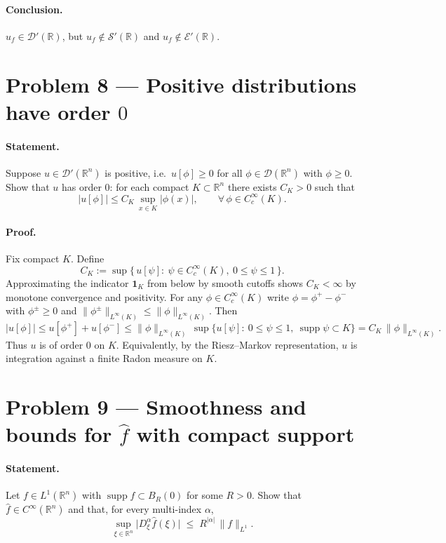 \documentclass[12pt,a4paper]{article}
\theoremstyle{plain}
\theoremstyle{definition}
\theoremstyle{remark}
\theoremstyle{remark}
\begin{document}
\paragraph{Conclusion.}
$u_f\in\mathcal D'(\mathbb R)$, but $u_f\notin\mathcal S'(\mathbb R)$ and $u_f\notin\mathcal E'(\mathbb R)$.

\bigskip
\bigskip

\section*{Problem 8 — Positive distributions have order $0$}

\paragraph{Statement.}
Suppose $u\in\mathcal D'(\mathbb R^n)$ is positive, i.e.\ $u[\phi]\ge 0$ for all $\phi\in\mathcal D(\mathbb R^n)$ with $\phi\ge 0$.
Show that $u$ has order $0$: for each compact $K\subset\mathbb R^n$ there exists $C_K>0$ such that
\[
|u[\phi]|\le C_K\,\sup_{x\in K}|\phi(x)|,\qquad \forall\,\phi\in C_c^\infty(K).
\]

\paragraph{Proof.}
Fix compact $K$. Define
\[
C_K:=\sup\{\,u[\psi]:\ \psi\in C_c^\infty(K),\ 0\le \psi\le 1\,\}.
\]
Approximating the indicator $\mathbf 1_K$ from below by smooth cutoffs shows $C_K<\infty$ by monotone convergence and positivity.
For any $\phi\in C_c^\infty(K)$ write $\phi=\phi^+-\phi^-$ with $\phi^\pm\ge 0$ and
$\|\phi^\pm\|_{L^\infty(K)}\le \|\phi\|_{L^\infty(K)}$. Then
\[
|u[\phi]|\le u[\phi^+]+u[\phi^-]
\le \|\phi\|_{L^\infty(K)}\,
\sup\{u[\psi]:\ 0\le\psi\le 1,\ \operatorname{supp}\psi\subset K\}
= C_K\,\|\phi\|_{L^\infty(K)}.
\]
Thus $u$ is of order $0$ on $K$. Equivalently, by the Riesz--Markov representation, $u$ is integration against a finite Radon measure on $K$.

\bigskip
\bigskip

\section*{Problem 9 — Smoothness and bounds for $\widehat f$ with compact support}

\paragraph{Statement.}
Let $f\in L^1(\mathbb R^n)$ with $\operatorname{supp}f\subset B_R(0)$ for some $R>0$.
Show that $\widehat f\in C^\infty(\mathbb R^n)$ and that, for every multi-index $\alpha$,
\[
\sup_{\xi\in\mathbb R^n}\big|D_\xi^\alpha \widehat f(\xi)\big|
\;\le\; R^{|\alpha|}\,\|f\|_{L^1}.
\]
\end{document}
